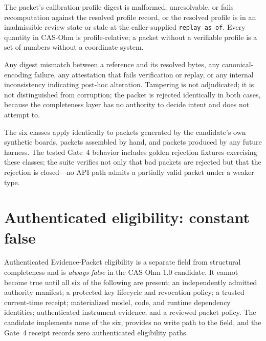 \begin{checkclass}\label{elig:cc:unknownprofile}
The packet's calibration-profile digest is malformed, unresolvable, or fails recomputation against the resolved profile record, or the resolved profile is in an inadmissible review state or stale at the caller-supplied \texttt{replay\_as\_of}. Every quantity in CAS-Ohm is profile-relative; a packet without a verifiable profile is a set of numbers without a coordinate system.
\end{checkclass}

\begin{checkclass}[Tampered]\label{elig:cc:tampered}
Any digest mismatch between a reference and its resolved bytes, any canonical-encoding failure, any attestation that fails verification or replay, or any internal inconsistency indicating post-hoc alteration. Tampering is not adjudicated; it is not distinguished from corruption; the packet is rejected identically in both cases, because the completeness layer has no authority to decide intent and does not attempt to.
\end{checkclass}

\begin{finding}\label{elig:find:symmetric}
The six classes apply identically to packets generated by the candidate's own synthetic boards, packets assembled by hand, and packets produced by any future harness. The tested Gate~4 behavior includes golden rejection fixtures exercising these classes; the suite verifies not only that bad packets are rejected but that the rejection is closed---no API path admits a partially valid packet under a weaker type.
\end{finding}

\section{Authenticated eligibility: constant false}\label{elig:sec:eligibility}

\begin{ruleenv}\label{elig:rule:constfalse}
Authenticated Evidence-Packet eligibility is a separate field from structural completeness and is \emph{always false} in the CAS-Ohm 1.0 candidate. It cannot become true until all six of the following are present: an independently admitted authority manifest; a protected key lifecycle and revocation policy; a trusted current-time receipt; materialized model, code, and runtime dependency identities; authenticated instrument evidence; and a reviewed packet policy. The candidate implements none of the six, provides no write path to the field, and the Gate~4 receipt records zero authenticated eligibility paths.
\end{ruleenv}

